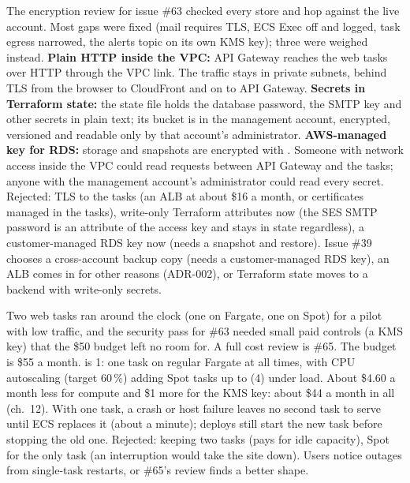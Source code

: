   {The encryption review for issue \#63 checked every store and hop against the live account.
   Most gaps were fixed (mail requires TLS, ECS Exec off and logged, task egress narrowed, the
   alerts topic on its own KMS key); three were weighed instead.}
  {\textbf{Plain HTTP inside the VPC:} API Gateway reaches the web tasks over HTTP through the
   VPC link. The traffic stays in private subnets, behind TLS from the browser to CloudFront and
   on to API Gateway. \textbf{Secrets in Terraform state:} the state file holds the database
   password, the SMTP key and other secrets in plain text; its bucket is in the management
   account, encrypted, versioned and readable only by that account's administrator.
   \textbf{AWS-managed key for RDS:} storage and snapshots are encrypted with .}
  {Someone with network access inside the VPC could read requests between API Gateway and the
   tasks; anyone with the management account's administrator could read every secret. Rejected:
   TLS to the tasks (an ALB at about \$16 a month, or certificates managed in the tasks), write-only
   Terraform attributes now (the SES SMTP password is an attribute of the access key and stays in
   state regardless), a customer-managed RDS key now (needs a snapshot and restore).}
  {Issue \#39 chooses a cross-account backup copy (needs a customer-managed RDS key), an ALB comes
   in for other reasons (ADR-002), or Terraform state moves to a backend with write-only secrets.}

  {Two web tasks ran around the clock (one on Fargate, one on Spot) for a pilot with low traffic,
   and the security pass for \#63 needed small paid controls (a KMS key) that the \$50 budget left
   no room for. A full cost review is \#65.}
  {The budget is \$55 a month.  is 1: one task on regular Fargate at all times,
   with CPU autoscaling (target 60\,\%) adding Spot tasks up to  (4) under load.}
  {About \$4.60 a month less for compute and \$1 more for the KMS key: about \$44 a month in all
   (ch.~12). With one task, a crash or host failure leaves no second task to serve until ECS
   replaces it (about a minute); deploys still start the new task before stopping the old one.
   Rejected: keeping two tasks (pays for idle capacity), Spot for the only task (an interruption
   would take the site down).}
  {Users notice outages from single-task restarts, or \#65's review finds a better shape.}

